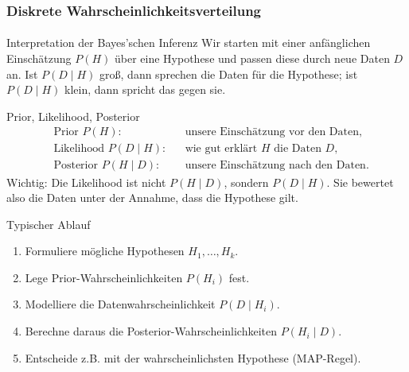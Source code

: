 \documentclass{beamer}
\begin{document}
\begin{frame}[shrink=5]
    \frametitle{Diskrete Wahrscheinlichkeitsverteilung}
\framesubtitle{}

\begin{block}{Interpretation der Bayes'schen Inferenz}
Wir starten mit einer anfänglichen Einschätzung $P(H)$ über eine Hypothese und passen diese durch neue Daten $D$ an.
Ist $P(D \mid H)$ groß, dann sprechen die Daten für die Hypothese; ist $P(D \mid H)$ klein, dann spricht das gegen sie.
\end{block}

\begin{block}{Prior, Likelihood, Posterior}
\begin{align*}
&\text{Prior } P(H): &&\text{unsere Einschätzung vor den Daten}, \\
&\text{Likelihood } P(D \mid H): &&\text{wie gut erklärt } H \text{ die Daten } D, \\
&\text{Posterior } P(H \mid D): &&\text{unsere Einschätzung nach den Daten}.
\end{align*}
Wichtig: Die Likelihood ist nicht $P(H \mid D)$, sondern $P(D \mid H)$. Sie bewertet also die Daten unter der Annahme, dass die Hypothese gilt.
\end{block}

\begin{block}{Typischer Ablauf}
\begin{enumerate}
\item Formuliere mögliche Hypothesen $H_1,\ldots,H_k$.
\item Lege Prior-Wahrscheinlichkeiten $P(H_i)$ fest.
\item Modelliere die Datenwahrscheinlichkeit $P(D \mid H_i)$.
\item Berechne daraus die Posterior-Wahrscheinlichkeiten $P(H_i \mid D)$.
\item Entscheide z.B. mit der wahrscheinlichsten Hypothese (MAP-Regel).
\end{enumerate}
\end{block}

 \end{frame}
\end{document}
